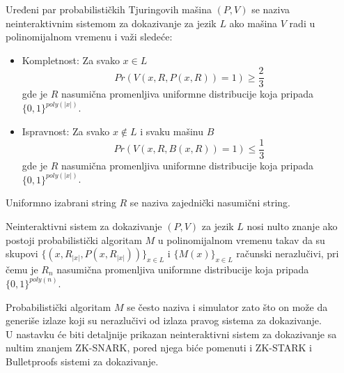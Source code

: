 \begin{definition}
	Uređeni par probabilističkih Tjuringovih mašina $(P,V)$ se naziva neinteraktivnim sistemom za dokazivanje za jezik $L$ ako mašina $V$ radi u polinomijalnom vremenu i važi sledeće:
	\begin{itemize}
		\item Kompletnost: Za svako $x \in L$
		$$Pr(V(x,R,P(x,R))=1)\geq \frac{2}{3}$$
		gde je $R$ nasumična promenljiva uniformne distribucije koja pripada $\{0,1\}^{poly(|x|)}$.
		\item Ispravnost: Za svako $x \notin L$ i svaku mašinu $B$
		$$Pr(V(x,R,B(x,R))=1)\leq \frac{1}{3}$$
		gde je $R$ nasumična promenljiva uniformne distribucije koja pripada $\{0,1\}^{poly(|x|)}$.
	\end{itemize}
	Uniformno izabrani string $R$ se naziva zajednički nasumični string.
\end{definition}
\begin{definition}
	Neinteraktivni sistem za dokazivanje $(P,V)$ za jezik $L$ nosi nulto znanje ako postoji probabilistički algoritam $M$ u polinomijalnom vremenu takav da su skupovi $\{(x, R_{|x|}, P(x,R_{|x|}))\}_{x \in L}$ i $\{M(x)\}_{x \in L}$ računski nerazlučivi, pri čemu je $R_{n}$ nasumična promenljiva uniformne distribucije koja pripada $\{0,1\}^{poly(n)}$.
\end{definition}

Probabilistički algoritam $M$ se često naziva i simulator zato što on može da generiše izlaze koji su nerazlučivi od izlaza pravog sistema za dokazivanje.\\




 U nastavku \' ce biti detaljnije prikazan  neinteraktivni sistem za dokazivanje sa nultim znanjem \textenglish{ZK-SNARK}, pored njega biće pomenuti i \textenglish{ZK-STARK} i \textenglish{Bulletproofs} sistemi za dokazivanje.

